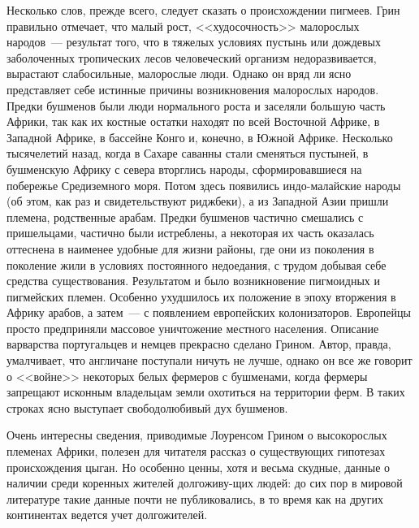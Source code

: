 \documentclass[12pt,a4paper,twoside,openany,svgnames]{memoir}
\begin{document}
Несколько слов, прежде всего, следует сказать о происхождении пигмеев. Грин правильно отмечает, что малый рост, <<худосочность>> малорослых народов~--- результат того, что в тяжелых условиях пустынь или дождевых заболоченных тропических лесов человеческий организм недоразвивается, вырастают слабосильные, малорослые люди. Однако он вряд ли ясно представляет себе истинные причины возникновения малорослых народов. Предки бушменов были люди нормального роста и заселяли большую часть Африки, так как их костные остатки находят по всей Восточной Африке, в Западной Африке, в бассейне Конго и, конечно, в Южной Африке. Несколько тысячелетий назад, когда в Сахаре саванны стали сменяться пустыней, в бушменскую Африку с севера вторглись народы, сформировавшиеся на побережье Средиземного моря. Потом здесь появились индо-малайские народы (об этом, как раз и свидетельствуют риджбеки), а из Западной Азии пришли племена, родственные арабам. Предки бушменов частично смешались с пришельцами, частично были истреблены, а некоторая их часть оказалась оттеснена в наименее удобные для жизни районы, где они из поколения в поколение жили в условиях постоянного недоедания, с трудом добывая себе средства существования. Результатом и было возникновение пигмоидных и пигмейских племен. Особенно ухудшилось их положение в эпоху вторжения в Африку арабов, а затем~--- с появлением европейских колонизаторов. Европейцы просто предприняли массовое уничтожение местного населения. Описание варварства португальцев и немцев прекрасно сделано Грином. Автор, правда, умалчивает, что англичане поступали ничуть не лучше, однако он все же говорит о <<войне>> некоторых белых фермеров с бушменами, когда фермеры запрещают исконным владельцам земли охотиться на территории ферм. В таких строках ясно выступает свободолюбивый дух бушменов.

Очень интересны сведения, приводимые Лоуренсом Грином о высокорослых племенах Африки, полезен для читателя рассказ о существующих гипотезах происхождения цыган. Но особенно ценны, хотя и весьма скудные, данные о наличии среди коренных жителей долгоживу-щих людей: до сих пор в мировой литературе такие данные почти не публиковались, в то время как на других континентах ведется учет долгожителей.
\end{document}
